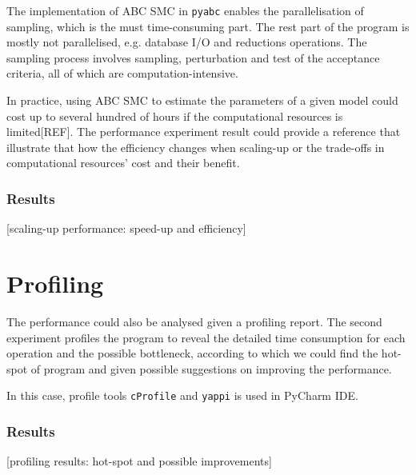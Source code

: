 \documentclass[12pt,a4paper]{report}
\begin{document}
The implementation of ABC SMC in \verb|pyabc| enables the parallelisation of sampling, which is the must time-consuming part. The rest part of the program is mostly not parallelised, e.g. database I/O and reductions operations. The sampling process involves sampling, perturbation and test of the acceptance criteria, all of which are computation-intensive. 

In practice, using ABC SMC to estimate the parameters of a given model could cost up to several hundred of hours if the computational resources is limited[REF]. The performance experiment result could provide a reference that illustrate that how the efficiency changes when scaling-up or the trade-offs in computational resources' cost and their benefit.

\subsubsection{Results}

[scaling-up performance: speed-up and efficiency]

\section{Profiling}

The performance could also be analysed given a profiling report. The second experiment profiles the program to reveal the detailed time consumption for each operation and the possible bottleneck, according to which we could find the hot-spot of program and given possible suggestions on improving the performance. 

In this case, profile tools \verb|cProfile| and \verb|yappi| is used in PyCharm IDE.

\subsubsection{Results} 

[profiling results: hot-spot and possible improvements]











\end{document}

